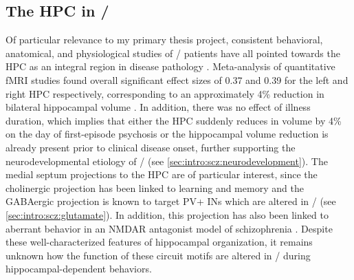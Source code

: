 \subsection{The \acl{HPC} in \scz/}
\label{sec:intro:scz:hpc}
Of particular relevance to my primary thesis project, consistent behavioral, anatomical, and physiological studies of \scz/ patients have all pointed towards the \ac{HPC} as an integral region in disease pathology \citep{Boyer2007, Bogerts1985, Jakob1986}.
Meta-analysis of quantitative \ac{fMRI} studies found overall significant effect sizes of 0.37 and 0.39 for the left and right \ac{HPC} respectively, corresponding to an approximately 4\% reduction in bilateral hippocampal volume \citep{Nelson1998}.
In addition, there was no effect of illness duration, which implies that either the \ac{HPC} suddenly reduces in volume by 4\% on the day of first-episode psychosis or the hippocampal volume reduction is already present prior to clinical disease onset, further supporting the neurodevelopmental etiology of \scz/ (see \autoref{sec:intro:scz:neurodevelopment}). 
The medial septum projections to the \ac{HPC} are of particular interest, since the cholinergic projection has been linked to learning and memory \citep{Parent2004} and the GABAergic projection is known to target \ac{PV}+ \acp{IN} \citep{Freund1988} which are altered in \scz/ (see \autoref{sec:intro:scz:glutamate}).
In addition,  this projection has also been linked to aberrant behavior in an \ac{NMDAR} antagonist model of schizophrenia \citep{Ma2012}.
Despite these well-characterized features of hippocampal organization, it remains unknown how the function of these circuit motifs are altered in \scz/ during hippocampal-dependent behaviors.

